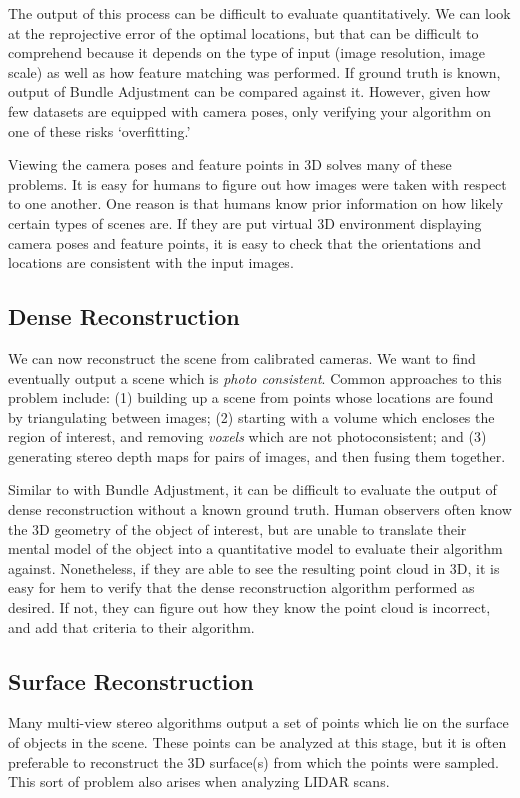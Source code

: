 \documentclass[10pt,twocolumn,letterpaper]{article}
\begin{document}

The output of this process can be difficult to evaluate quantitatively. We can look at the reprojective error of the optimal locations, but that can be difficult to comprehend because it depends on the type of input (image resolution, image scale) as well as how feature matching was performed. If ground truth is known, output of Bundle Adjustment can be compared against it. However, given how few datasets are equipped with camera poses, only verifying your algorithm on one of these risks `overfitting.'

Viewing the camera poses and feature points in 3D solves many of these problems. It is easy for humans to figure out how images were taken with respect to one another. One reason is that humans know prior information on how likely certain types of scenes are. If they are put virtual 3D environment displaying camera poses and feature points, it is easy to check that the orientations and locations are consistent with the input images. 

\subsection{Dense Reconstruction}

We can now reconstruct the scene from calibrated cameras. We want to find eventually output a scene which is \emph{photo consistent}. Common approaches to this problem include: (1) building up a scene from points whose locations are found by triangulating between images; (2) starting with a volume which encloses the region of interest, and removing \emph{voxels} which are not photoconsistent; and (3) generating stereo depth maps for pairs of images, and then fusing them together.\cite{furukawa}

Similar to with Bundle Adjustment, it can be difficult to evaluate the output of dense reconstruction without a known ground truth. Human observers often know the 3D geometry of the object of interest, but are unable to translate their mental model of the object into a quantitative model to evaluate their algorithm against. Nonetheless, if they are able to see the resulting point cloud in 3D, it is easy for hem to verify that the dense reconstruction algorithm performed as desired. If not, they can figure out how they know the point cloud is incorrect, and add that criteria to their algorithm.

\subsection{Surface Reconstruction}
Many multi-view stereo algorithms output a set of points which lie on the surface of objects in the scene. These points can be analyzed at this stage, but it is often preferable to reconstruct the 3D surface(s) from which the points were sampled. This sort of problem also arises when analyzing LIDAR scans.
\end{document}
